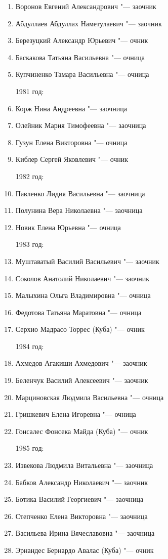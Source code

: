 \begin{enumerate}[nosep]
{1980 год:}
	\item Воронов Евгений Александрович "--- заочник
	\item Абдуллаев Абдуллах Наметулаевич "--- заочник
	\item Березуцкий Александр Юрьевич "--- очник
	\item Баскакова Татьяна Васильевна "--- очница
	\item Купчиненко Тамара Васильевна "--- очница

{1981 год:}
	\item Корж Нина Андреевна "--- заочница
	\item Олейник Мария Тимофеевна "--- заочница
	\item Гузун Елена Викторовна "--- очница
	\item Киблер Сергей Яковлевич "--- очник

{1982 год:}
	\item Павленко Лидия Васильевна "--- заочница
	\item Полунина Вера Николаевна "--- заочница
	\item Новик Елена Юрьевна "--- очница

{1983 год:}
	\item Муштаватый Василий Васильевич "--- заочник
	\item Соколов Анатолий Николаевич "--- заочник
	\item Малыхина Ольга Владимировна "--- очница
	\item Федотова Татьяна Маратовна "--- очница
	\item Серхио Мадрасо Торрес (Куба) "--- очник

{1984 год:}
	\item Ахмедов Агакиши Ахмедович "--- заочник
	\item Беленчук Василий Алексеевич "--- заочник
	\item Марциновская Людмила Васильевна "--- очница
	\item Гришкевич Елена Игоревна "--- очница
	\item Гонсалес Фонсека Майда (Куба) "--- очник

{1985 год:}
	\item Извекова Людмила Витальевна "--- заочница
	\item Бабков Александр Николаевич "--- заочник
	\item Ботика Василий Георгиевич "--- заочница
	\item Степченко Елена Викторовна "--- заочница
	\item Васильева Ирина Вячеславовна "--- заочница
	\item Эрнандес Бернардо Авалас (Куба) "--- очник


\end{enumerate}
